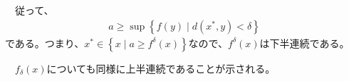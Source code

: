 \documentclass{article}
\begin{document}
　従って、
\begin{align*}
	a \geq \sup\left\{ f(y)\mid d(x^{*}, y)< \delta \right\}
\end{align*}
である。つまり、$x^{*}\in \left\{ x\mid a \geq f^{\delta}(x) \right\}$なので、$f^{\delta}(x)$は下半連続である。

　$f_{\delta}(x)$についても同様に上半連続であることが示される。
\end{document}
